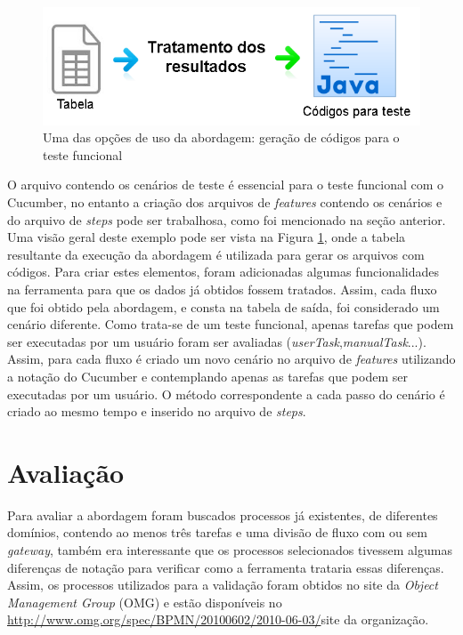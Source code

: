 \documentclass[12pt]{article}
\begin{document}
\begin{figure}[ht]
\centering
\includegraphics[width=.9\textwidth]{figuras/abordagem2.png}
\caption{Uma das opções de uso da abordagem: geração de códigos para o teste funcional}
\label{fig:abordagem2}
\end{figure}

O arquivo contendo os cenários de teste é essencial para o teste funcional com o Cucumber, no entanto a criação dos arquivos de \emph{features} contendo os cenários e do arquivo de \emph{steps} pode ser trabalhosa, como foi mencionado na seção anterior. Uma visão geral deste exemplo pode ser vista na Figura \ref{fig:abordagem2}, onde a tabela resultante da execução da abordagem é utilizada para gerar os arquivos com códigos. Para criar estes elementos, foram adicionadas algumas funcionalidades na ferramenta para que os dados já obtidos fossem tratados. Assim, cada fluxo que foi obtido pela abordagem, e consta na tabela de saída, foi considerado um cenário diferente. Como trata-se de um teste funcional, apenas tarefas que podem ser executadas por um usuário foram ser avaliadas (\emph{userTask},\emph{manualTask}...). Assim, para cada fluxo é criado um novo cenário no arquivo de \emph{features} utilizando a notação do Cucumber e contemplando apenas as tarefas que podem ser executadas por um usuário. O método correspondente a cada passo do cenário é criado ao mesmo tempo e inserido no arquivo de \emph{steps}. %


\section{Avaliação}
Para avaliar a abordagem foram buscados processos já existentes, de diferentes domínios, contendo ao menos três tarefas e uma divisão de fluxo com ou sem \emph{gateway}, também era interessante que os processos selecionados tivessem algumas diferenças de notação para verificar como a ferramenta trataria essas diferenças. Assim, os processos utilizados para a validação foram obtidos no site da \emph{Object Management Group} (OMG) e estão disponíveis no \url{http://www.omg.org/spec/BPMN/20100602/2010-06-03/}{site} da organização.
\end{document}
